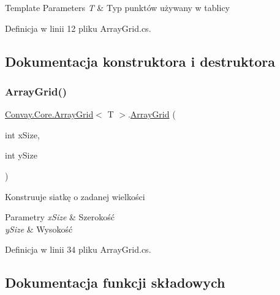 \begin{DoxyTemplParams}{Template Parameters}
{\em T} & Typ punktów używany w tablicy\\
\hline
\end{DoxyTemplParams}


Definicja w linii 12 pliku Array\+Grid.\+cs.



\subsection{Dokumentacja konstruktora i destruktora}
\hypertarget{class_convay_1_1_core_1_1_array_grid_af958573a897054ae4a946795082b3d5e}{}\label{class_convay_1_1_core_1_1_array_grid_af958573a897054ae4a946795082b3d5e} 
\subsubsection{\texorpdfstring{Array\+Grid()}{ArrayGrid()}}
{\footnotesize\ttfamily \hyperlink{class_convay_1_1_core_1_1_array_grid}{Convay.\+Core.\+Array\+Grid}$<$ T $>$.\hyperlink{class_convay_1_1_core_1_1_array_grid}{Array\+Grid} (\begin{DoxyParamCaption}\item[{int}]{x\+Size,  }\item[{int}]{y\+Size }\end{DoxyParamCaption})}



Konstruuje siatkę o zadanej wielkości 


\begin{DoxyParams}{Parametry}
{\em x\+Size} & Szerokość\\
\hline
{\em y\+Size} & Wysokość\\
\hline
\end{DoxyParams}


Definicja w linii 34 pliku Array\+Grid.\+cs.



\subsection{Dokumentacja funkcji składowych}
\hypertarget{class_convay_1_1_core_1_1_array_grid_a139eba7f8a6780b4ecbc446959e159ad}{}\label{class_convay_1_1_core_1_1_array_grid_a139eba7f8a6780b4ecbc446959e159ad} 
